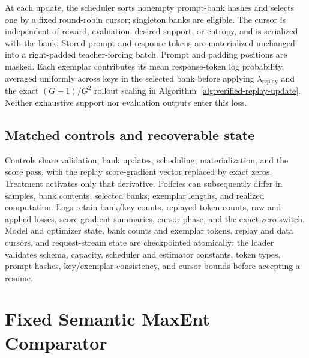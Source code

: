 \documentclass{article}
\newcommand{\1}{\mathbf 1}
\theoremstyle{remark}
\theoremstyle{definition}
\theoremstyle{plain}
\begin{document}
At each update, the scheduler sorts nonempty prompt-bank hashes and selects
one by a fixed round-robin cursor; singleton banks are eligible. The cursor
is independent of reward, evaluation, desired support, or entropy, and is
serialized with the bank. Stored prompt and response tokens are
materialized unchanged into a right-padded teacher-forcing batch. Prompt
and padding positions are masked. Each exemplar contributes its mean
response-token log probability, averaged uniformly across keys in the
selected bank before applying $\lambda_{\mathrm{replay}}$ and the exact
$(G-1)/G^2$ rollout scaling in
Algorithm~\ref{alg:verified-replay-update}. Neither exhaustive support nor
evaluation outputs enter this loss.

\subsection{Matched controls and recoverable state}
\label{app:algorithm-control}

Controls share validation, bank updates, scheduling, materialization, and
the score pass, with the replay score-gradient vector replaced by exact
zeros. Treatment activates only that derivative. Policies can subsequently
differ in samples, bank contents, selected banks, exemplar lengths, and
realized computation. Logs retain bank/key counts, replayed token counts,
raw and applied losses, score-gradient summaries, cursor phase, and the
exact-zero switch. Model and optimizer state, bank counts and exemplar
tokens, replay and data cursors, and request-stream state are checkpointed
atomically; the loader validates schema, capacity, scheduler and estimator
constants, token types, prompt hashes, key/exemplar consistency, and cursor
bounds before accepting a resume.

\section{Fixed Semantic MaxEnt Comparator}
\label{app:semantic-maxent}
\end{document}
